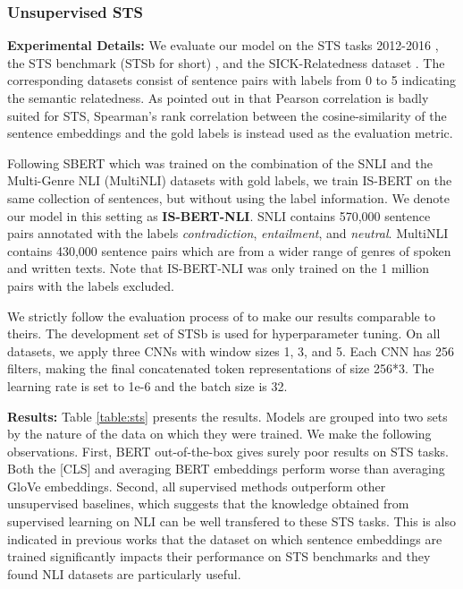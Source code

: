 \documentclass[11pt,a4paper]{article}
\begin{document}
\subsubsection{Unsupervised STS} \label{sts_data}
\textbf{Experimental Details:}
We evaluate our model on the STS tasks 2012-2016 \cite{agirre2012, agirre2013, agirre2014, agirre2015, agirre2016}, the STS benchmark (STSb for short) \cite{cer2017}, and the SICK-Relatedness dataset \cite{marelli2014}. The corresponding datasets consist of sentence pairs with labels from 0 to 5 indicating the semantic relatedness.  As pointed out in \citet{reimers2016} that Pearson correlation is badly suited for STS,  Spearman's rank correlation between the cosine-similarity of the sentence embeddings and the gold labels is instead used as the evaluation metric. 


Following SBERT which was trained on the  combination of the SNLI \cite{bowman2015} and the Multi-Genre NLI (MultiNLI) \cite{williams2018} datasets with gold labels, we train IS-BERT on the same collection of sentences, but without using the label information. We denote our model in this setting as {\textbf{IS-BERT-NLI}}. SNLI contains 570,000 sentence pairs annotated with the labels \emph{contradiction}, \emph{entailment}, and \emph{neutral}. MultiNLI contains 430,000 sentence pairs which are from a wider range of genres of spoken and written texts. Note that IS-BERT-NLI was only trained on the 1 million pairs with the labels excluded.

We strictly follow the evaluation process of \citet{reimers2019} to make our results comparable to theirs. The development set of STSb is used for hyperparameter tuning. On all datasets, we apply three CNNs with window sizes 1, 3, and 5. Each CNN has 256 filters, making the final concatenated token representations of size 256*3. The learning rate is set to 1e-6 and the batch size is 32. 
\medskip



\noindent\textbf{Results: } Table \ref{table:sts} presents the results. Models are grouped into two sets by the nature of the data on which they were trained. We make the following observations. First, BERT out-of-the-box gives surely poor results on STS tasks. Both the [CLS] and averaging BERT embeddings perform worse than averaging GloVe embeddings. Second, all supervised methods outperform other unsupervised baselines, which suggests that the knowledge obtained from supervised learning on NLI can be well transfered to these STS tasks. This is also indicated in previous works \cite{hill2016,cer2018} that the dataset on which sentence embeddings are trained significantly impacts their performance on STS benchmarks and they found NLI datasets are particularly useful. 
\end{document}
